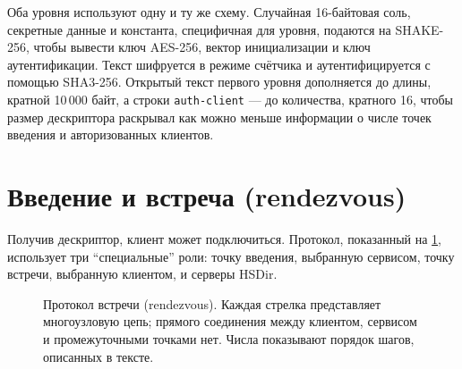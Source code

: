Оба уровня используют одну и ту же схему. Случайная 16-байтовая соль, секретные данные и константа, специфичная для уровня, подаются на SHAKE-256, чтобы вывести ключ AES-256, вектор инициализации и ключ аутентификации. Текст шифруется в режиме счётчика и аутентифицируется с помощью SHA3-256. Открытый текст первого уровня дополняется до длины, кратной 10\,000 байт, а строки \texttt{auth-client} — до количества, кратного 16, чтобы размер дескриптора раскрывал как можно меньше информации о числе точек введения и авторизованных клиентов.

\section{Введение и встреча (rendezvous)}\label{sec:os-rendezvous}

Получив дескриптор, клиент может подключиться. Протокол, показанный на \cref{fig:os-rendezvous}, использует три \enquote{специальные} роли: точку введения, выбранную сервисом, точку встречи, выбранную клиентом, и серверы HSDir.

\begin{figure}[htbp]
\centering

\caption{Протокол встречи (rendezvous). Каждая стрелка представляет многоузловую цепь; прямого соединения между клиентом, сервисом и промежуточными точками нет. Числа показывают порядок шагов, описанных в тексте.}
\label{fig:os-rendezvous}
\end{figure}

